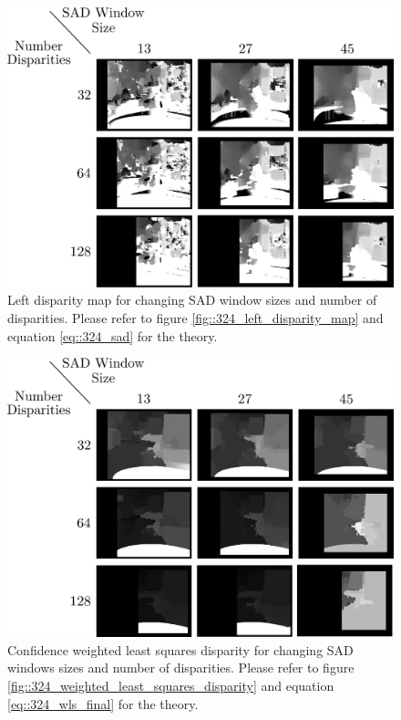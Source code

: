 \begin{figure}[h]
	\centering
	\includegraphics[scale=.28]{chapters/05_experiments/img/disp_sad.png}
	\caption{Left disparity map for changing SAD window sizes and number of disparities. Please refer to figure \ref{fig::324_left_disparity_map} and equation \ref{eq::324_sad} for the theory.}
	\label{fig::52_disp_sad}
\end{figure}
\begin{figure}[h]
	\centering
	\includegraphics[scale=.28]{chapters/05_experiments/img/disp_sad_wls.png}
	\caption{Confidence weighted least squares disparity for changing SAD windows sizes and number of disparities. Please refer to figure \ref{fig::324_weighted_least_squares_disparity} and equation \ref{eq::324_wls_final} for the theory.}
	\label{fig::52_disp_sad_wls}
\end{figure}
